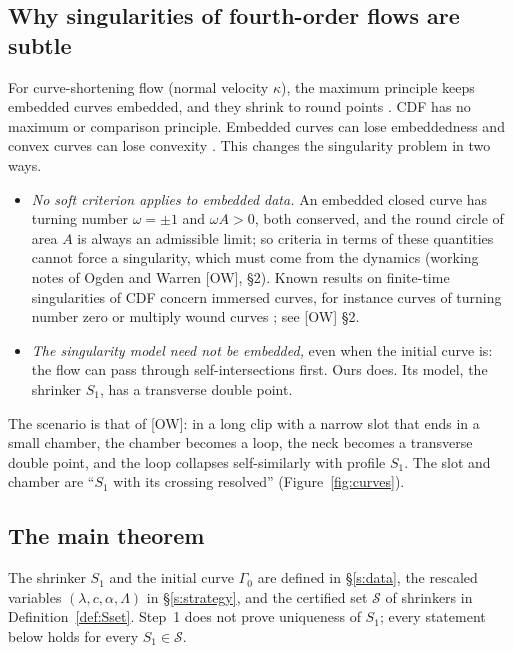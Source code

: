 \documentclass[11pt]{amsart}
\theoremstyle{definition}
\theoremstyle{remark}
\newcommand{\Lam}{\Lambda}
\newcommand{\dref}[1]{[\textsf{#1}]}
\newcommand{\Sset}{\mathcal S}
\begin{document}
\subsection{Why singularities of fourth-order flows are subtle}
For curve-shortening flow (normal velocity $\kappa$), the maximum principle keeps embedded curves embedded, and they shrink to round points \cite{Grayson1987}. CDF has no maximum or comparison principle. Embedded curves can lose embeddedness and convex curves can lose convexity \cite{GigaIto1998,GigaIto1999,MayerSimonett2000,Blatt2010}. This changes the singularity problem in two ways.
\begin{itemize}[leftmargin=*,itemsep=1pt]
\item \emph{No soft criterion applies to embedded data.} An embedded closed curve has turning number $\omega=\pm1$ and $\omega A>0$, both conserved, and the round circle of area $A$ is always an admissible limit; so criteria in terms of these quantities cannot force a singularity, which must come from the dynamics (working notes of Ogden and Warren \dref{OW}, \S2). Known results on finite-time singularities of CDF concern immersed curves, for instance curves of turning number zero or multiply wound curves \cite{Chou2003,EscherIto2005,EGMWW2015}; see \dref{OW} \S2.
\item \emph{The singularity model need not be embedded,} even when the initial curve is: the flow can pass through self-intersections first. Ours does. Its model, the shrinker $S_1$, has a transverse double point.
\end{itemize}
The scenario is that of \dref{OW}: in a long clip with a narrow slot that ends in a small chamber, the chamber becomes a loop, the neck becomes a transverse double point, and the loop collapses self-similarly with profile $S_1$. The slot and chamber are ``$S_1$ with its crossing resolved'' (Figure~\ref{fig:curves}).

\subsection{The main theorem}\label{ss:main}
The shrinker $S_1$ and the initial curve $\Gamma_0$ are defined in \S\ref{s:data}, the rescaled variables $(\lambda,c,\alpha,\Lam)$ in \S\ref{s:strategy}, and the certified set $\Sset$ of shrinkers in Definition~\ref{def:Sset}. Step~1 does not prove uniqueness of $S_1$; every statement below holds for every $S_1\in\Sset$.
\end{document}
